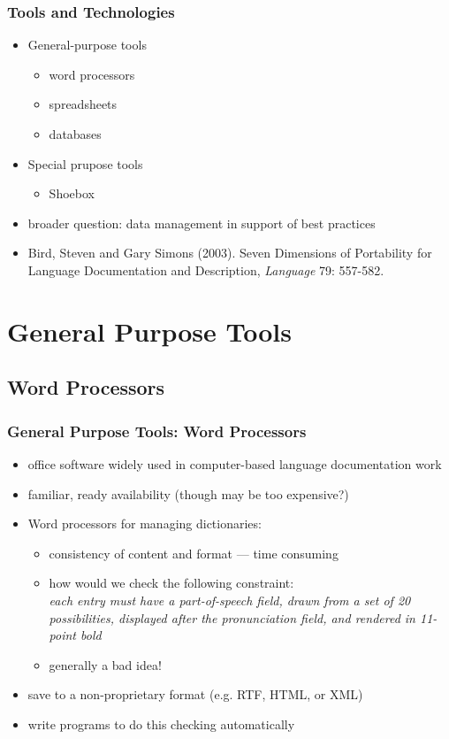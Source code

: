 \documentclass{beamer}
\begin{document}
\begin{frame}
\frametitle{Tools and Technologies}
\begin{itemize}
\item General-purpose tools
  \begin{itemize}
  \item word processors
  \item spreadsheets
  \item databases
  \end{itemize}
\item Special prupose tools
  \begin{itemize}
  \item Shoebox
  \end{itemize}
\item broader question: data management in support of best practices
\item Bird, Steven and Gary Simons (2003).  Seven Dimensions of Portability
    for Language Documentation and Description, \textit{Language} 79: 557-582.
\end{itemize}
\end{frame}

\section{General Purpose Tools}

\subsection{Word Processors}

\begin{frame}
\frametitle{General Purpose Tools: Word Processors}

\begin{itemize}
\item office software widely used in computer-based language
  documentation work
\item familiar, ready availability (though may be too expensive?)
\item Word processors for managing dictionaries:
  \begin{itemize}
  \item consistency of content and format --- time consuming
  \item how would we check the following constraint: \\
    \textit{each entry must have a part-of-speech field, drawn from a set of 20
     possibilities, displayed after the pronunciation field, and rendered
     in 11-point bold}
  \item generally a bad idea!
  \end{itemize}
\item save to a non-proprietary format (e.g. RTF, HTML, or XML)
\item write programs to do this checking automatically
\end{itemize}
\end{frame}
\end{document}
